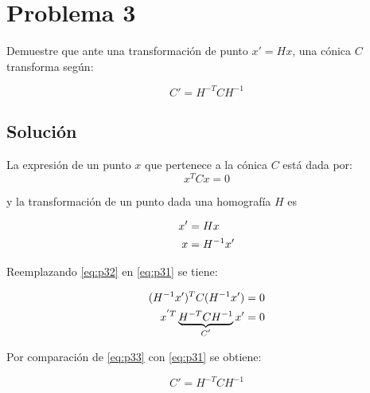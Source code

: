 \section*{Problema 3}
\setcounter{equation}{0}

Demuestre que ante una transformación de punto $x' = H x$, una cónica $C$ transforma según:

\begin{equation*}
C'= H^{-T} C H^{-1}
\label{eq:eqname}
\end{equation*} 

\subsection*{Solución}

La expresión de un punto $x$ que pertenece a la cónica $C$ está dada por:
\begin{equation}
x^T C x = 0
\label{eq:p31}
\end{equation} 

y la transformación de un punto dada una homografía $H$ es

\begin{align}
x'&= H x \notag \\
x &= H^{-1} x' \label{eq:p32}
\end{align} 

Reemplazando \ref{eq:p32} en \ref{eq:p31} se tiene:

\begin{align}
(H^{-1} x')^T C  (H^{-1} x') &= 0 \notag \\
x^{'T} \underbrace{H^{-T} C H^{-1}}_\text{$C'$} x' &= 0 \label{eq:p33} 
\end{align} 

Por comparación de \ref{eq:p33} con \ref{eq:p31} se obtiene:

\begin{equation}
C'= H^{-T} C H^{-1}
\label{eq:eqname}
\end{equation} 
